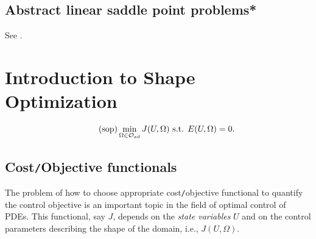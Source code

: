\documentclass[oneside,11pt]{book}
\numberwithin{equation}{section}
\begin{document}
\subsection{Abstract linear saddle point problems*}
See \cite[Chap. 3]{John2016}.

\section{Introduction to Shape Optimization}
\begin{align}
    \label{general SOP}
    \tag{sop}
    \min_{\Omega\in\mathcal{O}_{\rm ad}} J(U,\Omega)\mbox{ s.t. } E(U,\Omega) = 0.
\end{align}

\subsection{Cost\texttt{/}Objective functionals}
The problem of how to choose appropriate cost\texttt{/}objective functional to quantify the control objective is an important topic in the field of optimal control of PDEs. This functional, say $J$, depends on the \textit{state variables} $U$ and on the control parameters describing the shape of the domain, i.e., $J(U,\Omega)$.
\end{document}
